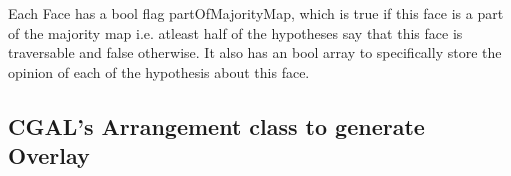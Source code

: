 Each Face has a bool flag partOfMajorityMap, which is true if this face is a part of the majority map i.e. atleast half of the 
hypotheses say that this face is traversable and false otherwise. It also has an bool array to specifically store the opinion of
 each of the hypothesis about this face.

\newpage
\subsection {CGAL's Arrangement class to generate Overlay}





